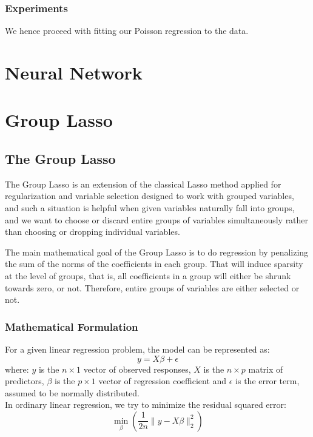 \documentclass[a4paper, 8pt]{article}
\begin{document}
\begin{multicols}{2}
\subsubsection{Experiments}
We hence proceed with fitting our Poisson regression to the data. 


\section{Neural Network}

\section{Group Lasso}
\subsection{The Group Lasso}
The Group Lasso is an extension of the classical Lasso method applied for regularization and variable selection designed to work with grouped variables, and such a situation is helpful when given variables naturally fall into groups, and we want to choose or discard entire groups of variables simultaneously rather than choosing or dropping individual variables.

The main mathematical goal of the Group Lasso is to do regression by penalizing the sum of the norms of the coefficients in each group. That will induce sparsity at the level of groups, that is, all coefficients in a group will either be shrunk towards zero, or not. Therefore, entire groups of variables are either selected or not.

\subsubsection*{Mathematical Formulation}
For a given linear regression problem, the model can be represented as:
\begin{equation}
y=X\beta + \epsilon
\end{equation}
where: $y$ is the $n \times 1$ vector of observed responses, $X$ is the $n \times p$ matrix of predictors, $\beta$ is the $p \times 1$ vector of regression coefficient and $\epsilon$ is the error term, assumed to be normally distributed.\\

In ordinary linear regression, we try to minimize the residual squared error:
\begin{equation}
\min_{\beta}\left (\frac{1}{2n}\lVert y-X\beta\rVert^{2}_{2} \right)
\end{equation}


\end{multicols}
\end{document}
